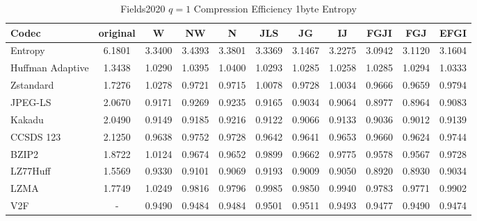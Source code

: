 \documentclass{article}
\begin{document}
\begin{table}[h!]
    \centering
    \caption{Fields2020 $q=1$ Compression Efficiency 1byte Entropy}
    \begin{tabular}{|l|cccccccccc|}
\hline
Codec &  original &      W &     NW &      N &    JLS &     JG &     IJ &   FGJI &    FGJ &   EFGI \\
\hline
Entropy &    6.1801 & 3.3400 & 3.4393 & 3.3801 & 3.3369 & 3.1467 & 3.2275 & 3.0942 & 3.1120 & 3.1604 \\ \hline
Huffman Adaptive                                &    1.3438 & 1.0290 & 1.0395 & 1.0400 & 1.0293 & 1.0285 & 1.0258 & 1.0285 & 1.0294 & 1.0333 \\
Zstandard                              &    1.7276 & 1.0278 & 0.9721 & 0.9715 & 1.0078 & 0.9728 & 1.0034 & 0.9666 & 0.9659 & 0.9794 \\
JPEG-LS                                &    2.0670 & 0.9171 & 0.9269 & 0.9235 & 0.9165 & 0.9034 & 0.9064 & 0.8977 & 0.8964 & 0.9083 \\
Kakadu  &    2.0490 & 0.9149 & 0.9185 & 0.9216 & 0.9122 & 0.9066 & 0.9133 & 0.9036 & 0.9012 & 0.9139 \\
CCSDS 123 &    2.1250 & 0.9638 & 0.9752 & 0.9728 & 0.9642 & 0.9641 & 0.9653 & 0.9660 & 0.9624 & 0.9744 \\
BZIP2                                 &    1.8722 & 1.0124 & 0.9674 & 0.9652 & 0.9899 & 0.9662 & 0.9775 & 0.9578 & 0.9567 & 0.9728 \\
LZ77Huff                         &    1.5569 & 0.9330 & 0.9101 & 0.9069 & 0.9193 & 0.9009 & 0.9050 & 0.8920 & 0.8930 & 0.9034 \\
LZMA                              &    1.7749 & 1.0249 & 0.9816 & 0.9796 & 0.9985 & 0.9850 & 0.9940 & 0.9783 & 0.9771 & 0.9902 \\
V2F                       &    - & 0.9490 & 0.9484 & 0.9484 & 0.9501 &  0.9511 & 0.9493 & 0.9477 & 0.9490 & 0.9474 \\
\hline
\end{tabular}
\end{table}
\end{document}
